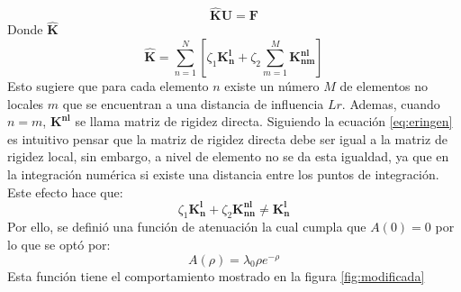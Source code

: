 \begin{equation}
	\boldsymbol{\hat{K}U}=\boldsymbol{F}
\end{equation}
Donde $\boldsymbol{\hat{K}}$
\begin{equation}
	\boldsymbol{\hat{K}}=\sum_{n=1}^{N}{\left[\zeta_1\boldsymbol{K_n^{l}}+\zeta_2\sum_{m=1}^{M}\boldsymbol{K_{nm}^{nl}}\right]}
\end{equation}
Esto sugiere que para cada elemento $n$ existe un número $M$ de elementos no locales $m$ que se encuentran a una distancia de influencia $Lr$. Ademas, cuando $n=m$, $\boldsymbol{K^{nl}}$ se llama matriz de rigidez directa. Siguiendo la ecuación \ref{eq:eringen} es intuitivo pensar que la matriz de rigidez directa debe ser igual a la matriz de rigidez local, sin embargo, a nivel de elemento no se da esta igualdad, ya que en la integración numérica si existe una distancia entre los puntos de integración. Este efecto hace que:
\begin{equation}
	\zeta_1\boldsymbol{K_{n}^{l}}+\zeta_2\boldsymbol{K_{nn}^{nl}}\neq\boldsymbol{K_{n}^{l}}
\end{equation}
Por ello, se definió una función de atenuación la cual cumpla que $A(0)=0$ por lo que se optó por:
\begin{equation}
	A(\rho)=\lambda_0\rho e^{-\rho}
\end{equation}
Esta función tiene el comportamiento mostrado en la figura \ref{fig:modificada}

